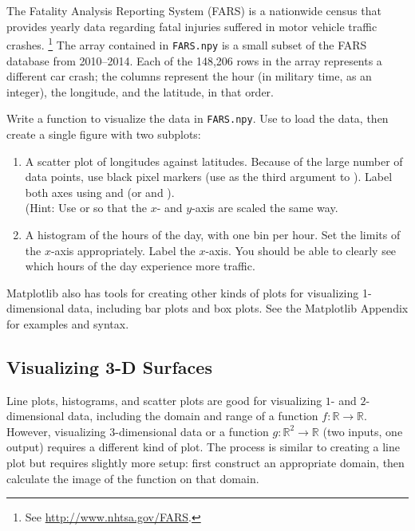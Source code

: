 
\begin{problem} %
The Fatality Analysis Reporting System (FARS) is a nationwide census that provides yearly data regarding fatal injuries suffered in motor vehicle traffic crashes.%
\footnote{See \url{http://www.nhtsa.gov/FARS}.}
The array contained in \texttt{FARS.npy} is a small subset of the FARS database from 2010--2014.
Each of the 148,206 rows in the array represents a different car crash; the columns represent the hour (in military time, as an integer), the longitude, and the latitude, in that order.

Write a function to visualize the data in \texttt{FARS.npy}.
Use  to load the data, then create a single figure with two subplots:
%
\begin{enumerate}
\item A scatter plot of longitudes against latitudes.
Because of the large number of data points, use black pixel markers (use  as the third argument to ).
Label both axes using  and  (or  and ).
\\
(Hint: Use  or  so that the $x$- and $y$-axis are scaled the same way.

\item A histogram of the hours of the day, with one bin per hour.
Set the limits of the $x$-axis appropriately.
Label the $x$-axis.
You should be able to clearly see which hours of the day experience more traffic.
\end{enumerate}
\end{problem}

Matplotlib also has tools for creating other kinds of plots for visualizing 1-dimensional data, including bar plots and box plots.
See the Matplotlib Appendix for examples and syntax.

\subsection*{Visualizing 3-D Surfaces} %

Line plots, histograms, and scatter plots are good for visualizing $1$- and $2$-dimensional data, including the domain and range of a function $f:\mathbb{R}\rightarrow\mathbb{R}$.
However, visualizing $3$-dimensional data or a function $g:\mathbb{R}^2\rightarrow\mathbb{R}$ (two inputs, one output) requires a different kind of plot.
The process is similar to creating a line plot but requires slightly more setup: first construct an appropriate domain, then calculate the image of the function on that domain.

